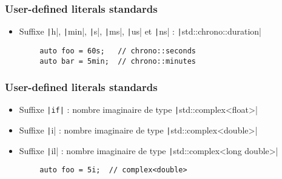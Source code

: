 \documentclass[C++.tex]{subfiles}
\begin{document}
\begin{frame}[fragile]
	\frametitle{User-defined literals standards}
	\begin{itemize}
		\item Suffixe \texttt|h|, \texttt|min|, \texttt|s|, \texttt|ms|, \texttt|us| et \texttt|ns| : \texttt|std::chrono::duration|
	\end{itemize}

	\begin{verbatim}
		auto foo = 60s;   // chrono::seconds
		auto bar = 5min;  // chrono::minutes
	\end{verbatim}

\end{frame}

\begin{frame}[fragile]
	\frametitle{User-defined literals standards}
	\begin{itemize}
		\item Suffixe \texttt{|if|} : nombre imaginaire de type \texttt|std::complex<float>|
		\item Suffixe \texttt|i| : nombre imaginaire de type \texttt|std::complex<double>|
		\item Suffixe \texttt|il| : nombre imaginaire de type \texttt|std::complex<long double>|
	\end{itemize}

	\begin{verbatim}
		auto foo = 5i;  // complex<double>
	\end{verbatim}

\end{frame}
\end{document}
